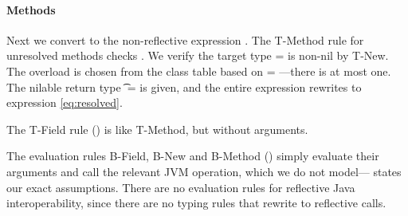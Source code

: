 \paragraph{Methods} Next we convert {\methodexp {\getparent{}} {\newstaticexp {\String} {\File{}} {\File{}} {}} {}}
to the non-reflective expression
{\methodstaticexp {\File} {} {\String} {\getparent{}} {\newstaticexp {\String} {\File{}} {\File{}} {}} {}}.
The T-Method rule for unresolved methods
checks {\methodexp {\getparent{}} {\newstaticexp {\String} {\File{}} {\File{}} {}} {}}.
We verify the target type \s{} = \File is non-nil by T-New.
The overload is chosen from the class table based on  = \File---there is at most one.
The nilable return type \t{} = \Union{\Nil}{\String} is given, and the 
entire expression rewrites to expression \ref{eq:resolved}.
%

The T-Field rule () is like T-Method, but without arguments.

The evaluation rules B-Field, B-New and B-Method () simply evaluate their
arguments and call the relevant JVM operation, which we do not model---
states our exact assumptions.
There are no evaluation rules for reflective Java interoperability, since there are no typing
rules that rewrite to reflective calls.


